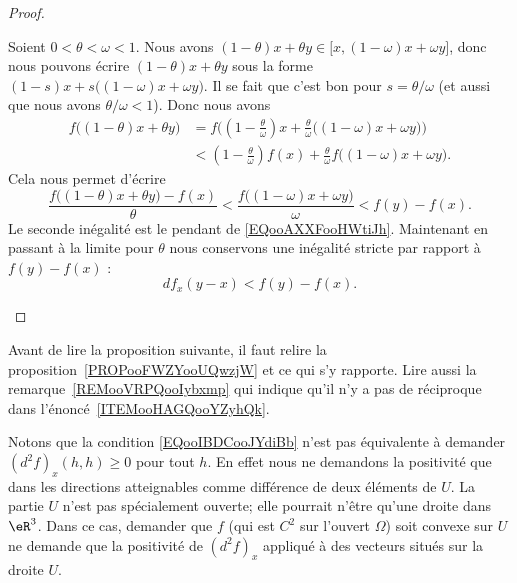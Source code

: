 \begin{proof}
\begin{subproof}
		Soient \( 0<\theta<\omega<1\). Nous avons \( (1-\theta)x+\theta y\in \mathopen[ x , (1-\omega)x+\omega y \mathclose]\), donc nous pouvons écrire \( (1-\theta)x+\theta y\) sous la forme \( (1-s)x+s\big( (1-\omega)x+\omega y \big)\). Il se fait que c'est bon pour \( s=\theta/\omega\) (et aussi que nous avons \( \theta/\omega<1\)). Donc nous avons
		\begin{subequations}
			\begin{align}
				f\big( (1-\theta)x+\theta y \big) & = f\Big( (1-\frac{ \theta }{ \omega })x+\frac{ \theta }{ \omega }\big( (1-\omega)x+\omega y \big) \Big) \\
				                                  & < (1-\frac{ \theta }{ \omega })f(x)+\frac{ \theta }{ \omega }f\big( (1-\omega)x+\omega y \big).
			\end{align}
		\end{subequations}
		Cela nous permet d'écrire
		\begin{equation}
			\frac{ f\big( (1-\theta)x+\theta y \big)-f(x) }{ \theta }<\frac{ f\big( (1-\omega)x+\omega y \big) }{ \omega }<f(y)-f(x).
		\end{equation}
		Le seconde inégalité est le pendant de \eqref{EQooAXXFooHWtiJh}. Maintenant en passant à la limite pour \( \theta\) nous conservons une inégalité stricte par rapport à \( f(y)-f(x)\) :
		\begin{equation}
			df_x(y-x)<f(y)-f(x).
		\end{equation}
	\end{subproof}
\end{proof}

Avant de lire la proposition suivante, il faut relire la proposition~\ref{PROPooFWZYooUQwzjW} et ce qui s'y rapporte.
Lire aussi la remarque~\ref{REMooVRPQooIybxmp} qui indique
qu'il n'y a pas de réciproque dans l'énoncé~\ref{ITEMooHAGQooYZyhQk}.


\begin{remark}      \label{REMooYCRKooEQNIkC}
	Notons que la condition \eqref{EQooIBDCooJYdiBb} n'est pas équivalente à demander \( (d^2f)_x(h,h)\geq 0\) pour tout \( h\). En effet nous ne demandons la positivité que dans les directions atteignables comme différence de deux éléments de \( U\). La partie \( U\) n'est pas spécialement ouverte; elle pourrait n'être qu'une droite dans \( \eR^3\). Dans ce cas, demander que \( f\) (qui est \( C^2\) sur l'ouvert \( \Omega\)) soit convexe sur \( U\) ne demande que la positivité de \( (d^2f)_x\) appliqué à des vecteurs situés sur la droite \( U\).
\end{remark}

